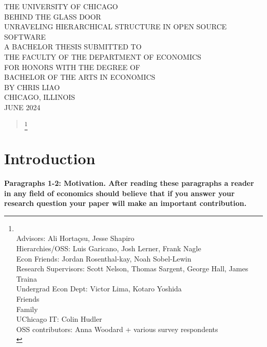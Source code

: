 \documentclass[12pt,notitlepage]{article}
\begin{document}
	\begin{titlepage}
\begin{center}
THE UNIVERSITY OF CHICAGO
\\[1.5in]
BEHIND THE GLASS DOOR\\
UNRAVELING HIERARCHICAL STRUCTURE IN OPEN SOURCE SOFTWARE
\\[1in]
A BACHELOR THESIS SUBMITTED TO \\
\bigskip
THE FACULTY OF THE DEPARTMENT OF ECONOMICS \\
\bigskip
FOR HONORS WITH THE DEGREE OF \\
\bigskip
BACHELOR OF THE ARTS IN ECONOMICS
\\[1.5in]
BY CHRIS LIAO
\\[2in]
CHICAGO, ILLINOIS \\
JUNE 2024
\end{center}
\end{titlepage}

\tableofcontents
\newpage

\begin{abstract}
   \footnote{\\
   Advisors: Ali Hortaçsu, Jesse Shapiro\\
   Hierarchies/OSS: Luis Garicano, Josh Lerner, Frank Nagle\\
   Econ Friends: Jordan Rosenthal-kay, Noah Sobel-Lewin\\
   Research Supervisors: Scott Nelson, Thomas Sargent, George Hall, James Traina \\
   Undergrad Econ Dept: Victor Lima, Kotaro Yoshida\\
   Friends \\
   Family \\
   UChicago IT: Colin Hudler \\
   OSS contributors: Anna Woodard + various survey respondents \\
   }
\end{abstract}
\newpage
\section{Introduction}
\textbf{Paragraphs 1-2: Motivation. After reading these paragraphs a reader in any field of economics should believe that if you answer your research question your paper will make an important contribution.}
\end{document}
